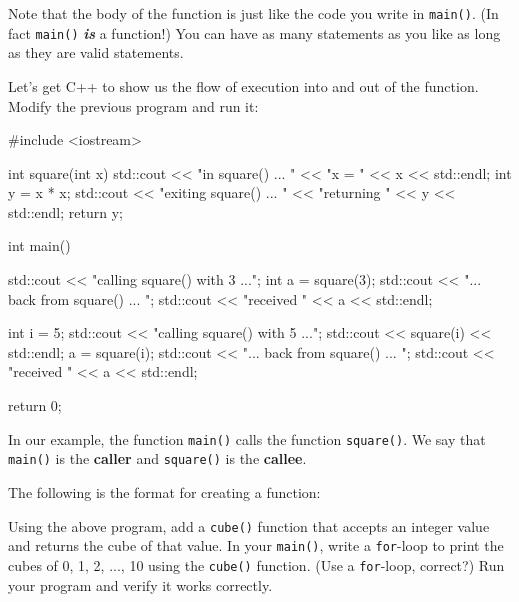 Note that the body of the function is just like the code you write in \texttt{main()}. (In fact \texttt{main()} \textbf{\textit{is}} a function!) You can have as many statements as you like as long as they are valid statements.

Let's get C++ to show us the flow of execution into and out of the function. Modify the previous program and run it:

\begin{consolethree}[escapeinside=||]
#include <iostream>

int square(int x)
{
    std::cout << "in square() ... "
              << "x = " << x << std::endl;
    int y = x * x;
    std::cout << "exiting square() ... "
              << "returning " << y << std::endl;
    return y;
}

int main()
{
    std::cout << "calling square() with 3 ...";
    int a = square(3);
    std::cout << "... back from square() ... ";
    std::cout << "received " << a << std::endl;

    int i = 5;
    std::cout << "calling square() with 5 ...";
    std::cout << square(i) << std::endl;
    a = square(i);
    std::cout << "... back from square() ... ";
    std::cout << "received " << a << std::endl;

    return 0;
}
\end{consolethree}

In our example, the function \texttt{main()} calls the function \texttt{square()}. We say that \texttt{main()} is the \textbf{caller} and \texttt{square()} is the \textbf{callee}.

The following is the format for creating a function:




\begin{ex}
Using the above program, add a \texttt{cube()} function that accepts an integer value and returns the cube of that value. In your \texttt{main()}, write a \texttt{for}-loop to print the cubes of 0, 1, 2, ..., 10 using the \texttt{cube()} function. (Use a \texttt{for}-loop, correct?) Run your program and verify it works correctly.
\end{ex}

